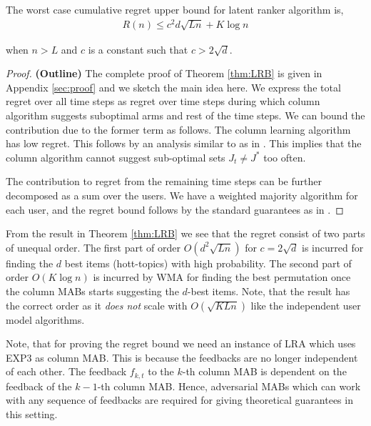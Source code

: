 \begin{theorem}
\label{thm:LRB}
The worst case cumulative regret upper bound for latent ranker algorithm is,
\begin{align*}
R(n) \leq c^2d \sqrt{L n} + K \log n
\end{align*}

when $n > L$ and $c$ is a constant such that $c > 2\sqrt{d}$.
\end{theorem}

\begin{proof} \textbf{(Outline)}
The complete proof of Theorem \ref{thm:LRB} is given in Appendix \ref{sec:proof} and we sketch the main idea here.  We  express the total regret over all time steps as regret over time steps during which column algorithm suggests suboptimal arms and rest of the time steps. We can bound the contribution due to the former term as follows. The column learning algorithm has  low regret. This follows by an analysis similar to as in \cite{radlinski2008learning}. This implies that the column algorithm cannot suggest sub-optimal sets $J_t \neq J^*$ too often. 

The contribution to regret from the remaining time steps can be further decomposed as a sum over the users. We have a weighted majority algorithm for each user, and the regret bound follows by the standard guarantees as in \cite{WMA}.
\end{proof}

\begin{discussion}
\label{disc:proof1}
From the result in Theorem \ref{thm:LRB} we see that the regret consist of two parts of unequal order. The first part of order $O\left(d^2 \sqrt{L n} \right)$ for $c = 2\sqrt{d}$ is incurred for finding the $d$ best items (hott-topics) with high probability. The second part of order $O\left( K\log n\right)$ is incurred by WMA for finding the best permutation once the column MABs starts suggesting the $d$-best items. Note, that the result has the correct order as it \textit{does not} scale with $O\left(\sqrt{KLn}\right)$ like the independent user model algorithms.
\end{discussion}

\begin{discussion}
\label{disc:proof2}
Note, that for proving the regret bound we need an instance of LRA which uses EXP3 as column MAB. This is because the feedbacks are no longer independent of each other. The feedback $f_{k,t}$ to the $k$-th column MAB  is dependent on the feedback of the $k-1$-th column MAB. Hence, adversarial MABs which can work with any sequence of feedbacks are required for giving theoretical guarantees in this setting.
\end{discussion}

